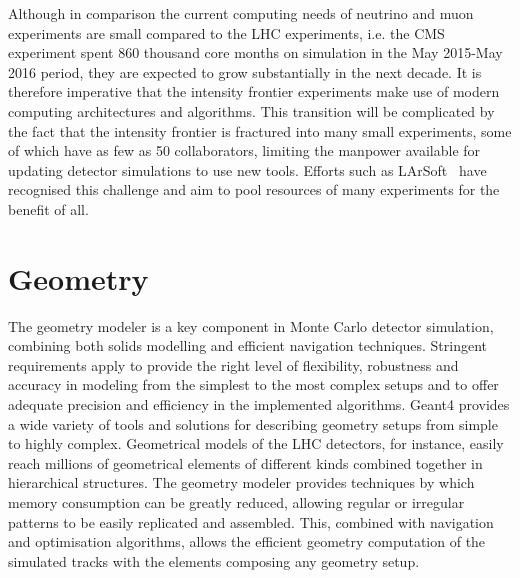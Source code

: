\documentclass[12pt,a4paper]{article}
\begin{document}
Although in comparison the current computing needs of neutrino and muon experiments
are small compared to the LHC experiments, i.e. the CMS experiment
spent 860 thousand core months on simulation in the May 2015-May 2016
period, they are expected to grow substantially in the next decade.
It is therefore imperative that the
intensity frontier experiments make use of modern computing
architectures and algorithms. This transition will be complicated by the
fact that the intensity frontier is fractured into many small
experiments, some of which have as few as 50 collaborators, limiting the
manpower available for updating detector simulations to use new tools.
Efforts such as LArSoft~\cite{LArSoft} have recognised this challenge and 
aim to pool resources of many experiments for the benefit of all.

\hypertarget{geometry}{%
\section{Geometry}\label{geometry}}

The geometry modeler is a key component in Monte Carlo detector
simulation, combining both solids modelling and efficient navigation
techniques. Stringent requirements apply to provide the right level of
flexibility, robustness and accuracy in modeling from the simplest to
the most complex setups and to offer adequate precision and efficiency
in the implemented algorithms. Geant4 provides a wide variety of
tools and solutions for describing geometry setups from simple to highly
complex. Geometrical models of the LHC detectors, for instance, easily
reach millions of geometrical elements of different kinds combined
together in hierarchical structures. The geometry modeler provides
techniques by which memory consumption can be greatly reduced, allowing
regular or irregular patterns to be easily replicated and assembled.
This, combined with navigation and optimisation algorithms, allows the
efficient geometry computation of the simulated tracks with the elements
composing any geometry setup.
\end{document}
